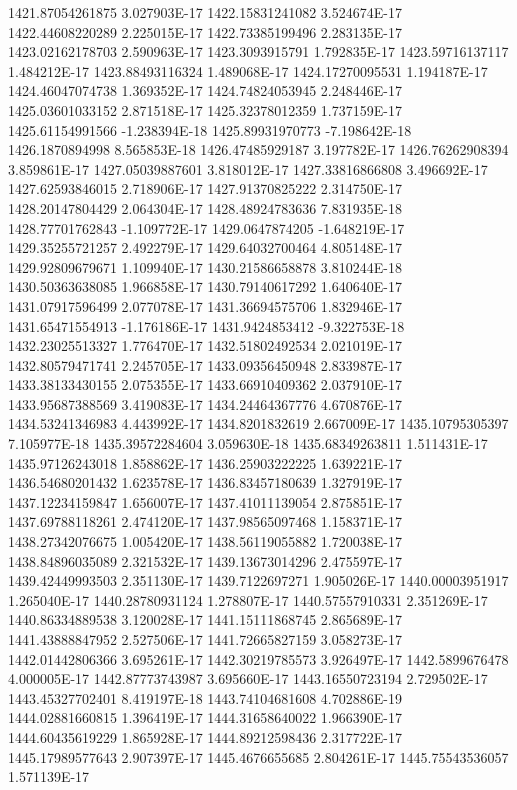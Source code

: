 1421.87054261875  3.027903E-17
1422.15831241082  3.524674E-17
1422.44608220289  2.225015E-17
1422.73385199496  2.283135E-17
1423.02162178703  2.590963E-17
1423.3093915791  1.792835E-17
1423.59716137117  1.484212E-17
1423.88493116324  1.489068E-17
1424.17270095531  1.194187E-17
1424.46047074738  1.369352E-17
1424.74824053945  2.248446E-17
1425.03601033152  2.871518E-17
1425.32378012359  1.737159E-17
1425.61154991566  -1.238394E-18
1425.89931970773  -7.198642E-18
1426.1870894998  8.565853E-18
1426.47485929187  3.197782E-17
1426.76262908394  3.859861E-17
1427.05039887601  3.818012E-17
1427.33816866808  3.496692E-17
1427.62593846015  2.718906E-17
1427.91370825222  2.314750E-17
1428.20147804429  2.064304E-17
1428.48924783636  7.831935E-18
1428.77701762843  -1.109772E-17
1429.0647874205  -1.648219E-17
1429.35255721257  2.492279E-17
1429.64032700464  4.805148E-17
1429.92809679671  1.109940E-17
1430.21586658878  3.810244E-18
1430.50363638085  1.966858E-17
1430.79140617292  1.640640E-17
1431.07917596499  2.077078E-17
1431.36694575706  1.832946E-17
1431.65471554913  -1.176186E-17
1431.9424853412  -9.322753E-18
1432.23025513327  1.776470E-17
1432.51802492534  2.021019E-17
1432.80579471741  2.245705E-17
1433.09356450948  2.833987E-17
1433.38133430155  2.075355E-17
1433.66910409362  2.037910E-17
1433.95687388569  3.419083E-17
1434.24464367776  4.670876E-17
1434.53241346983  4.443992E-17
1434.8201832619  2.667009E-17
1435.10795305397  7.105977E-18
1435.39572284604  3.059630E-18
1435.68349263811  1.511431E-17
1435.97126243018  1.858862E-17
1436.25903222225  1.639221E-17
1436.54680201432  1.623578E-17
1436.83457180639  1.327919E-17
1437.12234159847  1.656007E-17
1437.41011139054  2.875851E-17
1437.69788118261  2.474120E-17
1437.98565097468  1.158371E-17
1438.27342076675  1.005420E-17
1438.56119055882  1.720038E-17
1438.84896035089  2.321532E-17
1439.13673014296  2.475597E-17
1439.42449993503  2.351130E-17
1439.7122697271  1.905026E-17
1440.00003951917  1.265040E-17
1440.28780931124  1.278807E-17
1440.57557910331  2.351269E-17
1440.86334889538  3.120028E-17
1441.15111868745  2.865689E-17
1441.43888847952  2.527506E-17
1441.72665827159  3.058273E-17
1442.01442806366  3.695261E-17
1442.30219785573  3.926497E-17
1442.5899676478  4.000005E-17
1442.87773743987  3.695660E-17
1443.16550723194  2.729502E-17
1443.45327702401  8.419197E-18
1443.74104681608  4.702886E-19
1444.02881660815  1.396419E-17
1444.31658640022  1.966390E-17
1444.60435619229  1.865928E-17
1444.89212598436  2.317722E-17
1445.17989577643  2.907397E-17
1445.4676655685  2.804261E-17
1445.75543536057  1.571139E-17
